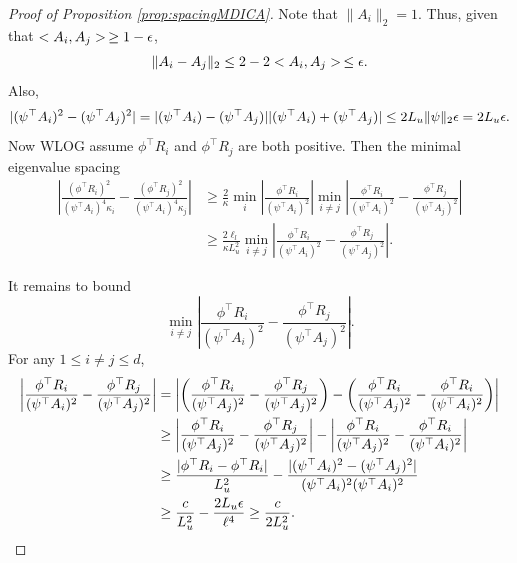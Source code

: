 \begin{proof}[Proof of Proposition \ref{prop:spacingMDICA}]
Note that $\|A_i\|_2 = 1$.  Thus, given that $<A_i, A_j> \,\ge 1-\epsilon$, 
\[
\|A_i - A_j\|_2 \le 2 - 2<A_i, A_j>\, \le \epsilon.
\]
Also, 
\[
|(\psi^{\top}A_i)^2 -(\psi^{\top}A_j)^2 |  =  |(\psi^{\top}A_i) -(\psi^{\top}A_j)| |(\psi^{\top}A_i) +(\psi^{\top}A_j)| \le 2L_u\|\psi\|_2 \epsilon = 2L_u\epsilon. 
\]
Now WLOG assume $\phi^{\top}R_i$ and $\phi^{\top}R_j$ are both positive. Then the minimal eigenvalue spacing 
\begin{align*}
\left\vert \frac{(\phi^{\top}R_i)^2}{(\psi^{\top}A_i)^4\kappa_i}  -  \frac{(\phi^{\top}R_j)^2}{(\psi^{\top}A_i)^4\kappa_j} \right\vert 
& \ge \frac{2}{\kappa} \min_i \left\vert  \frac{\phi^{\top}R_i}{(\psi^{\top}A_i)^2} \right\vert \min_{i\neq j} \left\vert  \frac{\phi^{\top}R_i}{(\psi^{\top}A_i)^2} -  \frac{\phi^{\top}R_j}{(\psi^{\top}A_j)^2}\right\vert 
\\
& \ge \frac{2\ell_l}{\kappa L_u^2} \min_{i\neq j} \left\vert  \frac{\phi^{\top}R_i}{(\psi^{\top}A_i)^2} -  \frac{\phi^{\top}R_j}{(\psi^{\top}A_j)^2} \right\vert. 
\end{align*}

It remains to bound 
\[
\min_{i\neq j} \left\vert  \frac{\phi^{\top}R_i}{(\psi^{\top}A_i)^2} -  \frac{\phi^{\top}R_j}{(\psi^{\top}A_j)^2}\right\vert.
\]
For any $1\le i\neq j \le d$,
\begin{align*}
 \left\vert  \frac{\phi^{\top}R_i}{(\psi^{\top}A_i)^2} -  \frac{\phi^{\top}R_j}{(\psi^{\top}A_j)^2} \right\vert 
 &
  =  \left\vert \left(\frac{\phi^{\top}R_i}{(\psi^{\top}A_j)^2} -   \frac{\phi^{\top}R_j}{(\psi^{\top}A_j)^2}\right) - \left(\frac{\phi^{\top}R_i}{(\psi^{\top}A_j)^2} - \frac{\phi^{\top}R_i}{(\psi^{\top}A_i)^2} \right) \right\vert \\
  & \ge  \left\vert \frac{\phi^{\top}R_i}{(\psi^{\top}A_j)^2} -   \frac{\phi^{\top}R_j}{(\psi^{\top}A_j)^2} \right\vert - \left\vert \frac{\phi^{\top}R_i}{(\psi^{\top}A_j)^2} - \frac{\phi^{\top}R_i}{(\psi^{\top}A_i)^2} \right\vert \\
  & \ge \frac{\vert \phi^{\top}R_i -  \phi^{\top}R_i \vert }{L_u^2} - \frac{\vert (\psi^{\top}A_i)^2 - (\psi^{\top}A_j)^2 \vert }{(\psi^{\top}A_i)^2(\psi^{\top}A_i)^2} \\
  & \ge \frac{c}{L_u^2} - \frac{2L_u\epsilon}{\ell^4} \ge \frac{c}{2L_u^2}.
\end{align*}
\end{proof}

